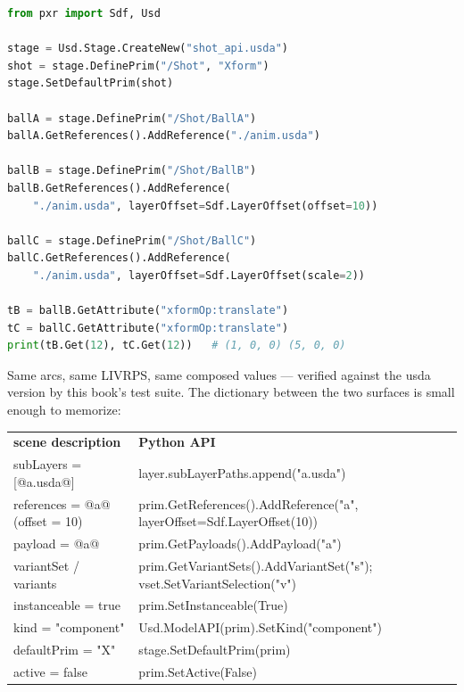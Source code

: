 \begin{lstlisting}[language=Python]
from pxr import Sdf, Usd

stage = Usd.Stage.CreateNew("shot_api.usda")
shot = stage.DefinePrim("/Shot", "Xform")
stage.SetDefaultPrim(shot)

ballA = stage.DefinePrim("/Shot/BallA")
ballA.GetReferences().AddReference("./anim.usda")

ballB = stage.DefinePrim("/Shot/BallB")
ballB.GetReferences().AddReference(
    "./anim.usda", layerOffset=Sdf.LayerOffset(offset=10))

ballC = stage.DefinePrim("/Shot/BallC")
ballC.GetReferences().AddReference(
    "./anim.usda", layerOffset=Sdf.LayerOffset(scale=2))

tB = ballB.GetAttribute("xformOp:translate")
tC = ballC.GetAttribute("xformOp:translate")
print(tB.Get(12), tC.Get(12))   # (1, 0, 0) (5, 0, 0)
\end{lstlisting}

\noindent Same arcs, same LIVRPS, same composed values --- verified against
the usda version by this book's test suite. The dictionary between the two
surfaces is small enough to memorize:

\begin{center}
\begin{tabular}{@{}p{1.55in}p{2.95in}@{}}
\textbf{\sffamily scene description} & \textbf{\sffamily Python API} \\[2pt]
\footnotesize\ttfamily subLayers = [@a.usda@] &
  \footnotesize\ttfamily layer.subLayerPaths.append("a.usda") \\[2pt]
\footnotesize\ttfamily references = @a@ (offset = 10) &
  \footnotesize\ttfamily prim.GetReferences().AddReference("a",
  layerOffset=Sdf.LayerOffset(10)) \\[2pt]
\footnotesize\ttfamily payload = @a@ &
  \footnotesize\ttfamily prim.GetPayloads().AddPayload("a") \\[2pt]
\footnotesize\ttfamily variantSet / variants &
  \footnotesize\ttfamily prim.GetVariantSets().AddVariantSet("s");
  vset.SetVariantSelection("v") \\[2pt]
\footnotesize\ttfamily instanceable = true &
  \footnotesize\ttfamily prim.SetInstanceable(True) \\[2pt]
\footnotesize\ttfamily kind = "component" &
  \footnotesize\ttfamily Usd.ModelAPI(prim).SetKind("component") \\[2pt]
\footnotesize\ttfamily defaultPrim = "X" &
  \footnotesize\ttfamily stage.SetDefaultPrim(prim) \\[2pt]
\footnotesize\ttfamily active = false &
  \footnotesize\ttfamily prim.SetActive(False) \\
\end{tabular}
\end{center}

